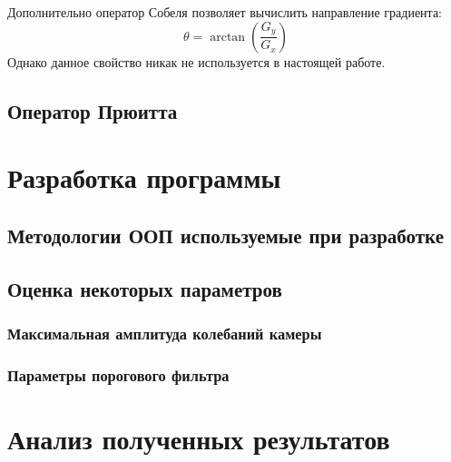 Дополнительно оператор Собеля позволяет вычислить направление градиента:
$$
\theta = \arctan \left( \frac{G_y}{G_x} \right)  
$$
Однако данное свойство никак не используется в настоящей работе.
\subsection{Оператор Прюитта}

\section{Разработка программы}
\subsection{Методологии ООП используемые при разработке}
\subsection{Оценка некоторых параметров}
\subsubsection{Максимальная амплитуда колебаний камеры}
\subsubsection{Параметры порогового фильтра}
\section{Анализ полученных результатов}